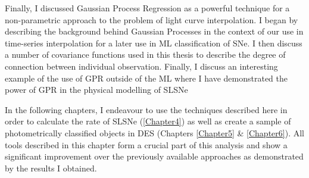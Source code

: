Finally, I discussed Gaussian Process Regression as a powerful technique for a non-parametric approach to the problem of light curve interpolation. I began by describing the background behind Gaussian Processes in the context of our use in time-series interpolation for a later use in ML classification of SNe. I then discuss a number of covariance functions used in this thesis to describe the degree of connection between individual observation. Finally, I discuss an interesting example of the use of GPR outside of the ML where I have demonstrated the power of GPR in the physical modelling of SLSNe

In the following chapters, I endeavour to use the techniques described here in order to calculate the rate of SLSNe (\cref{Chapter4}) as well as create a sample of photometrically classified objects in DES (Chapters \ref{Chapter5} \& \ref{Chapter6}). All tools described in this chapter form a crucial part of this analysis and show a significant improvement over the previously available approaches as demonstrated by the results I obtained.
